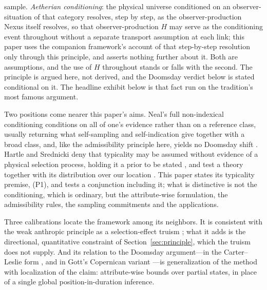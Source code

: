 sample. \emph{Aetherian conditioning}: the physical universe conditioned on an observer-situation of that category resolves, step by step, as the observer-production Nexus itself resolves, so that observer-production $H$ may serve as the conditioning event throughout without a separate transport assumption at each link; this paper uses the companion framework's account of that step-by-step resolution \cite{Aethus} only through this principle, and asserts nothing further about it. Both are assumptions, and the use of $H$ throughout stands or falls with the second. The principle is argued here, not derived, and the Doomsday verdict below is stated conditional on it. The headline exhibit below is that fact run on the tradition's most famous argument.

Two positions come nearer this paper's aims. Neal's full non-indexical conditioning conditions on all of one's evidence rather than on a reference class, usually returning what self-sampling and self-indication give together with a broad class, and, like the admissibility principle here, yields no Doomsday shift \cite{Neal2006}. Hartle and Srednicki deny that typicality may be assumed without evidence of a physical selection process, holding it a prior to be stated \cite{hartle2007typical}, and test a theory together with its distribution over our location \cite{srednicki2010large}. This paper states its typicality premise, (P1), and tests a conjunction including it; what is distinctive is not the conditioning, which is ordinary, but the attribute-wise formulation, the admissibility rules, the sampling commitments and the applications.

Three calibrations locate the framework among its neighbors. It is consistent with the weak anthropic principle as a selection-effect truism \cite{bostrom2002anthropic}; what it adds is the directional, quantitative constraint of Section~\ref{sec:principle}, which the truism does not supply. And its relation to the Doomsday argument---in the Carter--Leslie form \cite{leslie1996end}, and in Gott's Copernican variant \cite{gott1993implications}---is generalization of the method with localization of the claim: attribute-wise bounds over partial states, in place of a single global position-in-duration inference. 

